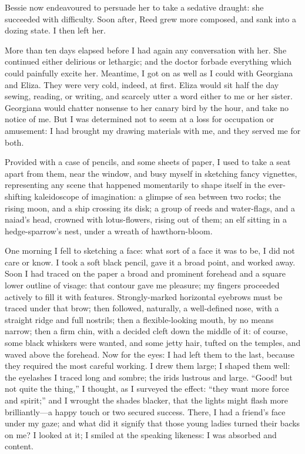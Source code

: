 Bessie now endeavoured to persuade her to take a sedative draught: she
succeeded with difficulty. Soon after, \Mrs{} Reed grew more composed,
and sank into a dozing state. I then left her.

More than ten days elapsed before I had again any conversation with
her. She continued either delirious or lethargic; and the doctor
forbade everything which could painfully excite her. Meantime, I got on
as well as I could with Georgiana and Eliza. They were very cold,
indeed, at first. Eliza would sit half the day sewing, reading, or
writing, and scarcely utter a word either to me or her sister. 
Georgiana would chatter nonsense to her canary bird by the hour, and
take no notice of me. But I was determined not to seem at a loss for
occupation or amusement: I had brought my drawing materials with me, and
they served me for both.

Provided with a case of pencils, and some sheets of paper, I used to
take a seat apart from them, near the window, and busy myself in
sketching fancy vignettes, representing any scene that happened
momentarily to shape itself in the ever-shifting kaleidoscope of
imagination: a glimpse of sea between two rocks; the rising moon, and a
ship crossing its disk; a group of reeds and water-flags, and a naiad's
head, crowned with lotus-flowers, rising out of them; an elf sitting in
a hedge-sparrow's nest, under a wreath of hawthorn-bloom.

One morning I fell to sketching a face: what sort of a face it was to
be, I did not care or know. I took a soft black pencil, gave it a broad
point, and worked away. Soon I had traced on the paper a broad and
prominent forehead and a square lower outline of visage: that contour
gave me pleasure; my fingers proceeded actively to fill it with
features. Strongly-marked horizontal eyebrows must be traced under that
brow; then followed, naturally, a well-defined nose, with a straight
ridge and full nostrils; then a flexible-looking mouth, by no means
narrow; then a firm chin, with a decided cleft down the middle of it: of
course, some black whiskers were wanted, and some jetty hair, tufted on
the temples, and waved above the forehead. Now for the eyes: I had left
them to the last, because they required the most careful working. I
drew them large; I shaped them well: the eyelashes I traced long and
sombre; the irids lustrous and large. \enquote{Good! but not quite the
thing,} I thought, as I surveyed the effect: \enquote{they want more
force and spirit;} and I wrought the shades blacker, that the lights
might flash more brilliantly---a happy touch or two secured success. 
There, I had a friend's face under my gaze; and what did it signify that
those young ladies turned their backs on me? I looked at it; I smiled
at the speaking likeness: I was absorbed and content.

